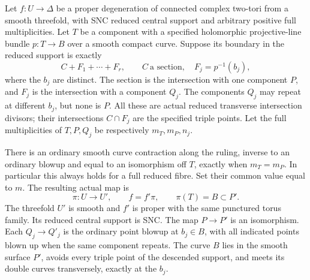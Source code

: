 \begin{proposition}\label{cdp:st:C.2.UN.74}

Let $f:U\to\Delta$ be a proper degeneration of connected
complex two-tori from a smooth threefold, with SNC reduced
central support and arbitrary positive full multiplicities.
Let $T$ be a component with a specified holomorphic
projective-line bundle $p:T\to B$ over a smooth compact
curve. Suppose its boundary in the reduced support is
exactly
\[
           C+F_1+\cdots+F_r,\qquad
           C\ \text{a section},\quad F_j=p^{-1}(b_j),
\tag{C.RC.1}\label{cdp:eq:C.RC.1}
\]
where the $b_j$ are distinct. The section is the
intersection with one component $P$, and $F_j$ is the
intersection with a component $Q_j$. The components
$Q_j$ may repeat at different $b_j$, but none is $P$.
All these are actual reduced transverse intersection
divisors; their intersections $C\cap F_j$ are the
specified triple points. Let the full multiplicities
of $T,P,Q_j$ be respectively $m_T,m_P,n_j$.

There is an ordinary smooth curve contraction along
the ruling, inverse to an ordinary blowup and equal
to an isomorphism off $T$, exactly when
$m_T=m_P$. In particular this always holds for a
full reduced fibre. Set their common value equal
to $m$. The resulting actual map is
\[
              \pi:U\longrightarrow U',\qquad
              f=f'\pi,\qquad \pi(T)=B\subset P'.
\tag{C.RC.2}\label{cdp:eq:C.RC.2}
\]
The threefold $U'$ is smooth and $f'$ is proper with
the same punctured torus family. Its reduced central
support is SNC. The map $P\to P'$ is an isomorphism.
Each $Q_j\to Q'_j$ is the ordinary point blowup at
$b_j\in B$, with all indicated points blown up when
the same component repeats. The curve $B$ lies in
the smooth surface $P'$, avoids every triple point
of the descended support, and meets its double
curves transversely, exactly at the $b_j$.


\end{proposition}
